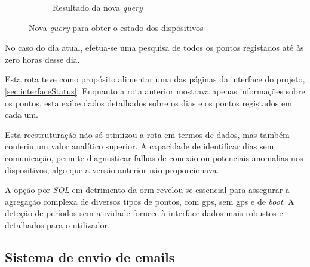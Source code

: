 \begin{figure}[!h]
\begin{subfigure}[c]{0.45\textwidth}
		\caption{Resultado da nova \textit{query}}
        \label{fig:returnNewQuery}
	\end{subfigure}
	\caption{Nova \textit{query} para obter o estado dos dispositivos}
\end{figure}


No caso do dia atual, efetua-se uma pesquisa de todos os pontos registados até às zero horas desse dia.

Esta rota teve como propósito alimentar uma das páginas da interface do projeto, \autoref{sec:interfaceStatus}. Enquanto a rota anterior mostrava apenas informações sobre os pontos, esta exibe dados detalhados sobre os dias e os pontos registados em cada um.

Esta reestruturação não só otimizou a rota em termos de dados, mas também conferiu um valor analítico superior. A capacidade de identificar dias sem comunicação, permite diagnosticar falhas de conexão ou potenciais anomalias nos dispositivos, algo que a versão anterior não proporcionava.

A opção por \textit{SQL} em detrimento da \acs{orm} revelou-se essencial para assegurar a agregação complexa de diversos tipos de pontos, com \acs{gps}, sem \acs{gps} e de \textit{boot}. A deteção de períodos sem atividade fornece à interface dados mais robustos e detalhados para o utilizador.

\clearpage
\subsection{Sistema de envio de emails} %



